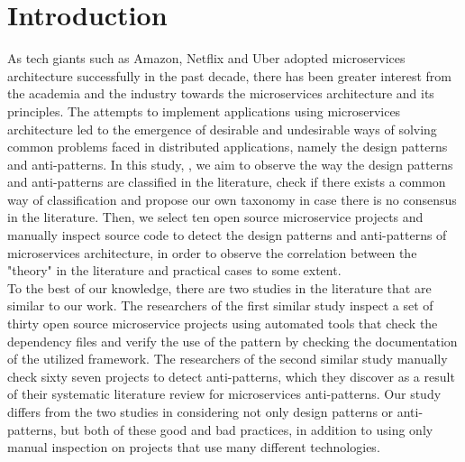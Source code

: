 \documentclass[11pt,a4paper,twocolumn]{article}
\begin{document}



\section{Introduction}
\label{sec:introduction}

As tech giants such as Amazon, Netflix and Uber adopted microservices architecture successfully in the past decade, there has been greater interest from the academia and the industry towards the microservices architecture and its principles.
The attempts to implement applications using microservices architecture led to the emergence of desirable and undesirable ways of solving common problems faced in distributed applications, namely the design patterns and anti-patterns.
In this study, , we aim to observe the way the design patterns and anti-patterns are classified in the literature, check if there exists a common way of classification and propose our own taxonomy in case there is no consensus in the literature.
Then, we select ten open source microservice projects and manually inspect source code to detect the design patterns and anti-patterns of microservices architecture, in order to observe the correlation between the "theory" in the literature and practical cases to some extent.
\\
To the best of our knowledge, there are two studies in the literature that are similar to our work.
The researchers of the first similar study \cite{8719492} inspect a set of thirty open source microservice projects using automated tools that check the dependency files and verify the use of the pattern by checking the documentation of the utilized framework.
The researchers of the second similar study \cite{10.1145/3424771.3424812} manually check sixty seven projects to detect anti-patterns, which they discover as a result of their systematic literature review for microservices anti-patterns.
Our study differs from the two studies in considering not only design patterns or anti-patterns, but both of these good and bad practices, in addition to using only manual inspection on projects that use many different technologies.
\end{document}
